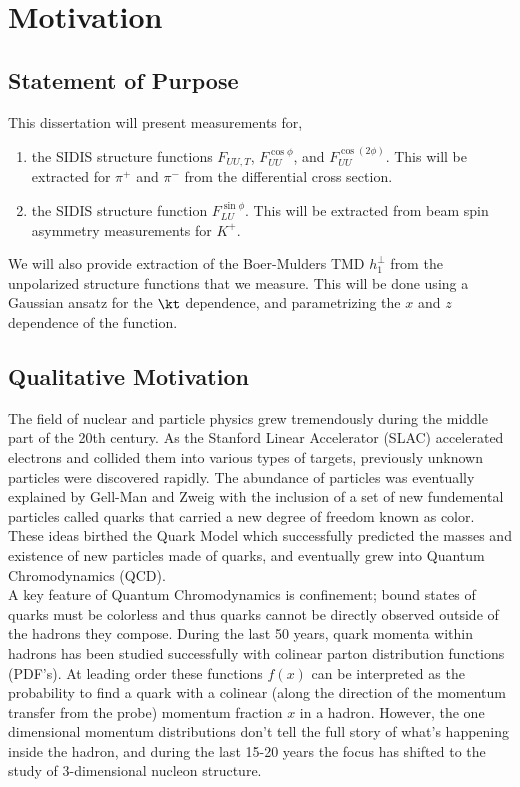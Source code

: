 
\section{Motivation}

\subsection{Statement of Purpose}
This dissertation will present measurements for, 

\begin{enumerate}
  \item the SIDIS structure functions $F_{UU,T}$, $F_{UU}^{\cos\phi}$, and $F_{UU}^{\cos(2\phi)}$.  This will be extracted for $\pi^+$ and $\pi^-$ from the differential cross section.
  \item the SIDIS structure function $F_{LU}^{\sin\phi}$.  This will be extracted from beam spin asymmetry measurements for $K^{+}$.
\end{enumerate}

We will also provide extraction of the Boer-Mulders TMD $h_{1}^{\perp}$ from the unpolarized structure functions that we measure.  This will be done using a Gaussian ansatz for the $\kt$ dependence, and parametrizing the $x$ and $z$ dependence of the function.  

\subsection{Qualitative Motivation}

The field of nuclear and particle physics grew tremendously during the middle part of the 20th century.  As the Stanford Linear Accelerator (SLAC) accelerated electrons and collided them into various types of targets, previously unknown particles were discovered rapidly.  The abundance of particles was eventually explained by Gell-Man and Zweig with the inclusion of a set of new fundemental particles called quarks that carried a new degree of freedom known as color.  These ideas birthed the Quark Model which successfully predicted the masses and existence of new particles made of quarks, and eventually grew into Quantum Chromodynamics (QCD).  \\

A key feature of Quantum Chromodynamics is confinement; bound states of quarks must be colorless and thus quarks cannot be directly observed outside of the hadrons they compose.  During the last 50 years, quark momenta within hadrons has been studied successfully with colinear parton distribution functions (PDF's).  At leading order these functions $f(x)$ can be interpreted as the probability to find a quark with a colinear (along the direction of the momentum transfer from the probe) momentum fraction $x$ in a hadron.  However, the one dimensional momentum distributions don't tell the full story of what's happening inside the hadron, and during the last 15-20 years the focus has shifted to the study of 3-dimensional nucleon structure. \\

